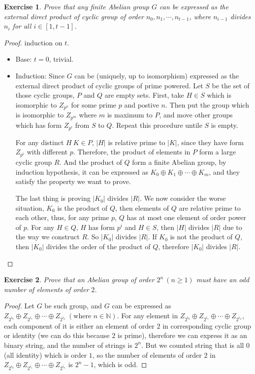 \documentclass[14pt]{extarticle}
\newtheorem{exercise}{Exercise}[section]
\newcommand{\join}[3][,]{#2_0 #1 #2_1 #1 \cdots #1 #2_{#3}}
\newcommand{\1}{\{e\}}
\begin{document}
\setcounter{exercise}{10}
\begin{exercise}
  Prove that any finite Abelian group $G$ can be expressed as the external direct product 
  of cyclic group of order $\join{n}{t - 1}$,
  where $n_{i - 1}$ divides $n_i$ for all $i \in [ 1 , t - 1 ]$.
\end{exercise}
\begin{proof}
  induction on $t$.
  \begin{itemize}
    \item Base: $t = 0$, trivial.
    \item Induction: Since $G$ can be (uniquely, up to isomorphism) expressed as the external direct product of
      cyclic groups of prime powered. Let $S$ be the set of those cyclic groups, $P$ and $Q$ are empty sets.
      First, take $H \in S$ which is isomorphic to $Z_{p^n}$ for some prime $p$ and postive $n$.
      Then put the group which is isomorphic to $Z_{p^m}$ where $m$ is maximum to $P$,
      and move other groups which has form $Z_{p^i}$ from $S$ to $Q$.
      Repeat this procedure untile $S$ is empty.
      
      For any distinct $H \ K \in P$, $|H|$ is relative prime to $|K|$, since they 
      have form $Z_{p^i}$ with different $p$.
      Therefore, the product of elements in $P$ form a large cyclic group $R$.
      And the product of $Q$ form a finite Abelian group, by induction hypothesis,
      it can be expressed as $\join[\oplus]{K}{m}$, and they satisfy the property we want to prove.

      The last thing is proving $|K_0|$ divides $|R|$.
      We now consider the worse situation, $K_0$ is the product of $Q$,
      then elements of $Q$ are relative prime to each other, thus, for any prime $p$,
      $Q$ has at most one element of order power of $p$.
      For any $H \in Q$,
      $H$ has form $p^i$ and $H \in S$, then $|H|$ divides $|R|$ due to the
      way we construct $R$. So $|K_0|$ divides $|R|$.
      If $K_0$ is not the product of $Q$, then $|K_0|$ divides the order of the product of $Q$,
      therefore $|K_0|$ divides $|R|$.
  \end{itemize}
\end{proof}

{
\newcommand{\Z}[1]{Z_{2^{i_0}} \oplus Z_{2^{i_1}} \oplus \cdots \oplus Z_{2^{i_#1}}}

\begin{exercise}
  Prove that an Abelian group of order $2^n \ (n \geq 1)$ 
  must have an odd number of elements of order $2$.
\end{exercise}
\begin{proof}
  Let $G$ be such group, and $G$ can be expressed as 
  $\Z{n} \ (\text{where } n \in \mathbb{N})$.
  For any element in $\Z{n}$, each component of it is either
  an element of order $2$ in corresponding cyclic group or identity (we can do this because $2$ is prime),
  therefore we can express it as an binary string, and the number of strings is $2^n$.
  But we counted string that is all $0$ (all identity) which is order $1$, so
  the number of elements of order $2$ in $\Z{n}$ is $2^n - 1$, which is odd.
\end{proof}
}
\end{document}
